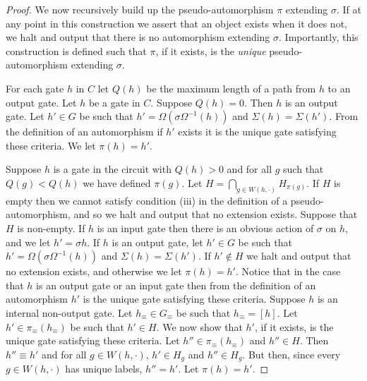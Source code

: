 \documentclass[../paper.tex]{subfiles}
\begin{document}
\begin{proof}
We now recursively build up the pseudo-automorphism $\pi$ extending $\sigma$. If
at any point in this construction we assert that an object exists when it does
not, we halt and output that there is no automorphism extending $\sigma$.
Importantly, this construction is defined such that $\pi$, if it exists, is the
\emph{unique} pseudo-automorphism extending $\sigma$.

For each gate $h$ in $C$ let $Q(h)$ be the maximum length of a path from $h$ to
an output gate. Let $h$ be a gate in $C$. Suppose $Q(h) = 0$. Then $h$ is an
output gate. Let $h' \in G$ be such that $h' = \Omega (\sigma \Omega^{-1}(h))$
and $\Sigma (h) = \Sigma (h')$. From the definition of an automorphism if $h'$
exists it is the unique gate satisfying these criteria. We let $\pi (h) = h'$.

Suppose $h$ is a gate in the circuit with $Q(h) > 0$ and for all $g$ such that
$Q(g ) < Q(h)$ we have defined $\pi (g)$. Let $H = \bigcap_{g \in W(h, \cdot)}
H_{\pi(g)}$. If $H$ is empty then we cannot satisfy condition (iii) in the
definition of a pseudo-automorphism, and so we halt and output that no extension
exists. Suppose that $H$ is non-empty. If $h$ is an input gate then there is an
obvious action of $\sigma$ on $h$, and we let $h' = \sigma h$. If $h$ is an
output gate, let $h' \in G$ be such that $h' = \Omega (\sigma \Omega^{-1} (h))$
and $\Sigma (h) = \Sigma (h')$. If $h' \not\in H$ we halt and output that no
extension exists, and otherwise we let $\pi (h) = h'$. Notice that in the case
that $h$ is an output gate or an input gate then from the definition of an
automorphism $h'$ is the unique gate satisfying these criteria. Suppose $h$ is
an internal non-output gate. Let $h_\equiv \in G_\equiv$ be such that $h_\equiv
= [h]$. Let $h' \in \pi_\equiv (h_\equiv)$ be such that $h' \in H$. We now show
that $h'$, if it exists, is the unique gate satisfying these criteria. Let $h''
\in \pi_\equiv (h_\equiv)$ and $h'' \in H$. Then $h'' \equiv h'$ and for all $g
\in W(h, \cdot)$, $h' \in H_g$ and $h'' \in H_g$. But then, since every $g \in
W(h, \cdot)$ has unique labels, $h'' = h'$. Let $\pi (h) = h'$.


\end{proof}
\end{document}
